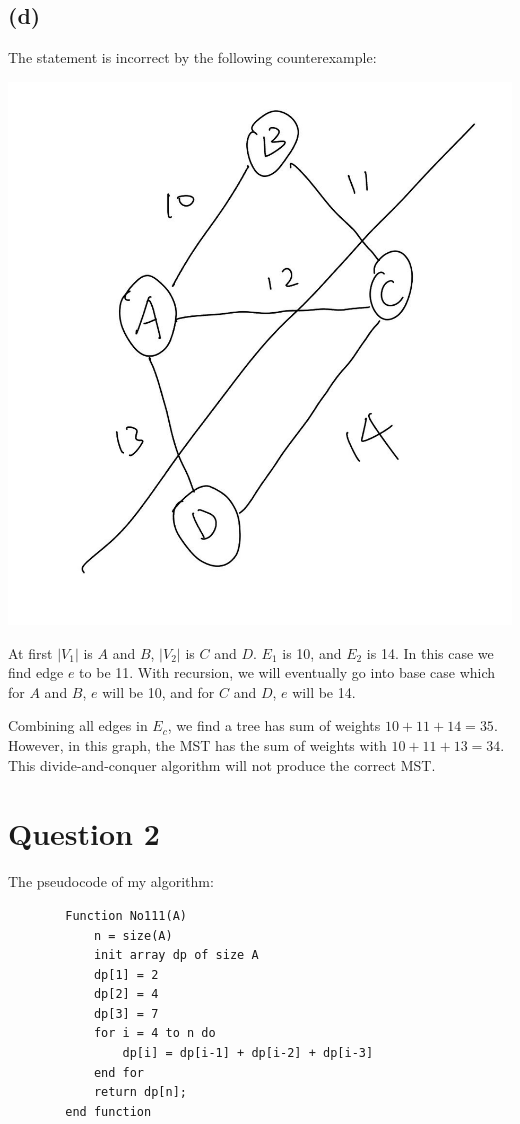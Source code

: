 \documentclass{article}
\begin{document}
\subsection*{(d)}
The statement is incorrect by the following counterexample:
\begin{center}
    \includegraphics[scale = 0.2]{q1d.jpg}
\end{center}
At first $|V_1|$ is $A$ and $B$, $|V_2|$ is $C$ and $D$. $E_1$ is 10, and $E_2$ is 14. In this case we find edge $e$ to be 11.
With recursion, we will eventually go into base case which for $A$ and $B$, $e$ will be 10, and for $C$ and $D$, $e$ will be 14.

Combining all edges in $E_c$, we find a tree has sum of weights $10+11+14=35$. However, in this graph, the MST has the sum of weights 
with $10+11+13=34$. This divide-and-conquer algorithm will not produce the correct MST.



\section*{Question 2}
The pseudocode of my algorithm:
    \begin{verbatim}
        Function No111(A)
            n = size(A)
            init array dp of size A
            dp[1] = 2
            dp[2] = 4
            dp[3] = 7
            for i = 4 to n do
                dp[i] = dp[i-1] + dp[i-2] + dp[i-3]
            end for
            return dp[n];
        end function
    \end{verbatim}
\end{document}
